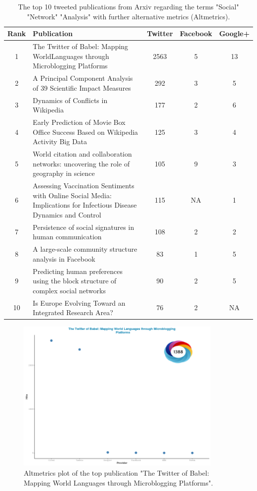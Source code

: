 \documentclass[fleqn,10pt,lineno]{wlpeerj} %
\begin{document}
\begin{table}[ht]
\centering
\begin{tabular}{c|p{8cm}|c|c|c}
Rank & Publication & Twitter & Facebook & Google+ \\\hline
1 & The Twitter of Babel: Mapping World\newline Languages through Microblogging Platforms & 2563 & 5 & 13 \\
2 & A Principal Component Analysis of 39 Scientific Impact Measures & 292 & 3 & 5 \\
3 & Dynamics of Conflicts in Wikipedia & 177 & 2 & 6 \\
4 & Early Prediction of Movie Box Office Success Based on Wikipedia Activity Big Data & 125 & 3 & 4 \\
5 & World citation and collaboration networks: uncovering the role of geography in science & 105 & 9 & 3 \\
6 & Assessing Vaccination Sentiments with Online Social Media: Implications for Infectious Disease Dynamics and Control & 115 & NA & 1 \\
7 & Persistence of social signatures in human communication & 108 & 2 & 2 \\
8 & A large-scale community structure analysis in Facebook & 83 & 1 & 5 \\
9 & Predicting human preferences using the block structure of complex social networks & 90 & 2 & 5 \\
10 & Is Europe Evolving Toward an Integrated Research Area? & 76 & 2 & NA
\end{tabular}
\caption{\label{tab:altmetrics}The top 10 tweeted publications from Arxiv regarding the terms "Social" "Network" "Analysis" with further alternative metrics (Altmetrics).}
\end{table}

\begin{figure}[ht]\centering
\includegraphics[width=10cm]{altmetrics-01.png}
\caption{Altmetrics plot of the top publication "The Twitter of Babel: Mapping World Languages through Microblogging Platforms".}
\label{fig:altmetrics-01}
\end{figure}
\end{document}
